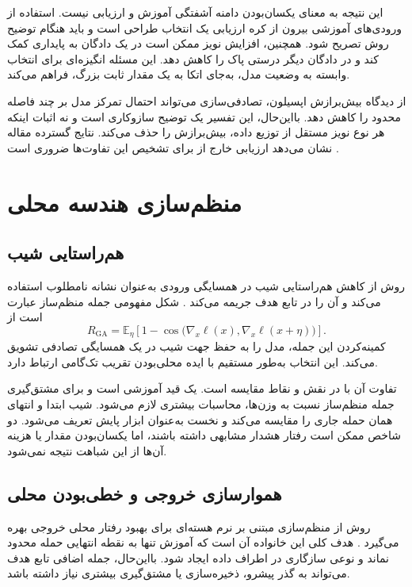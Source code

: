 این نتیجه به معنای یکسان‌بودن دامنه آشفتگی آموزش و ارزیابی نیست. استفاده از ورودی‌های آموزشی بیرون از کره ارزیابی یک انتخاب طراحی است و باید هنگام توضیح روش تصریح شود. همچنین، افزایش نویز ممکن است در یک دادگان به پایداری کمک کند و در دادگان دیگر درستی پاک را کاهش دهد. این مسئله انگیزه‌ای برای انتخاب وابسته به وضعیت مدل، به‌جای اتکا به یک مقدار ثابت بزرگ، فراهم می‌کند.

از دیدگاه بیش‌برازش اپسیلون، تصادفی‌سازی می‌تواند احتمال تمرکز مدل بر چند فاصله محدود را کاهش دهد. بااین‌حال، این تفسیر یک توضیح سازوکاری است و نه اثبات اینکه هر نوع نویز مستقل از توزیع داده، بیش‌برازش را حذف می‌کند. نتایج گسترده مقاله نشان می‌دهد ارزیابی خارج از  برای تشخیص این تفاوت‌ها ضروری است \cite{sora2026}.

\section{منظم‌سازی هندسه محلی}
\subsection{هم‌راستایی شیب}
روش  از کاهش هم‌راستایی شیب در همسایگی ورودی به‌عنوان نشانه نامطلوب استفاده می‌کند و آن را در تابع هدف جریمه می‌کند \cite{andriushchenko2020understanding}. شکل مفهومی جمله منظم‌ساز عبارت است از
\begin{equation}
R_{\mathrm{GA}}=\mathbb E_{\eta}\left[1-
\cos\bigl(\nabla_x\ell(x),\nabla_x\ell(x+\eta)\bigr)\right].
\end{equation}
کمینه‌کردن این جمله، مدل را به حفظ جهت شیب در یک همسایگی تصادفی تشویق می‌کند. این انتخاب به‌طور مستقیم با ایده محلی‌بودن تقریب تک‌گامی ارتباط دارد.

تفاوت آن با \pertalign{} در نقش و نقاط مقایسه است.  یک قید آموزشی است و برای مشتق‌گیری جمله منظم‌ساز نسبت به وزن‌ها، محاسبات بیشتری لازم می‌شود. \pertalign{} شیب ابتدا و انتهای همان حمله جاری را مقایسه می‌کند و نخست به‌عنوان ابزار پایش تعریف می‌شود. دو شاخص ممکن است رفتار هشدار مشابهی داشته باشند، اما یکسان‌بودن مقدار یا هزینه آن‌ها از این شباهت نتیجه نمی‌شود.

\subsection{هموارسازی خروجی و خطی‌بودن محلی}
روش  از منظم‌سازی مبتنی بر نرم هسته‌ای برای بهبود رفتار محلی خروجی بهره می‌گیرد \cite{sriramanan2021towards}. هدف کلی این خانواده آن است که آموزش تنها به نقطه انتهایی حمله محدود نماند و نوعی سازگاری در اطراف داده ایجاد شود. بااین‌حال، جمله اضافی تابع هدف می‌تواند به گذر پیشرو، ذخیره‌سازی یا مشتق‌گیری بیشتری نیاز داشته باشد.

